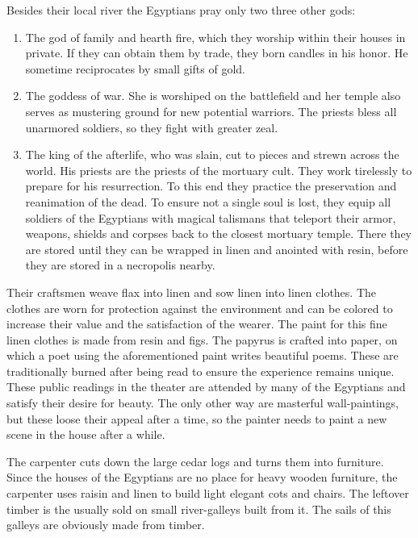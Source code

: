 \documentclass[a4paper]{book}
\begin{document}
Besides their local river the \gls{Egyptians} pray only two three other gods:

\begin{enumerate}
	\item The god of family and hearth fire, which they worship within their houses in
	      private. If they can obtain them by trade, they born candles in his honor. He
	      sometime reciprocates by small gifts of gold.
	\item The goddess of war. She is worshiped on the battlefield and her temple also
	      serves as mustering ground for new potential warriors. The priests bless all
	      unarmored soldiers, so they fight with greater zeal.
	\item The king of the afterlife, who was slain, cut to pieces and strewn across the
	      world. His priests are the priests of the mortuary cult. They work tirelessly
	      to prepare for his resurrection. To this end they practice the preservation and
	      reanimation of the dead. To ensure not a single soul is lost, they equip all
	      soldiers of the \gls{Egyptians} with magical talismans that teleport their
	      armor, weapons, shields and corpses back to the closest mortuary temple. There
	      they are stored until they can be wrapped in linen and anointed with resin,
	      before they are stored in a necropolis nearby.
\end{enumerate}

Their craftsmen weave flax into linen and sow linen into linen clothes. The
clothes are worn for protection against the environment and can be colored to
increase their value and the satisfaction of the wearer. The paint for this
fine linen clothes is made from resin and figs. The papyrus is crafted into
paper, on which a poet using the aforementioned paint writes beautiful poems.
These are traditionally burned after being read to ensure the experience
remains unique. These public readings in the theater are attended by many of
the \gls{Egyptians} and satisfy their desire for beauty. The only other way are
masterful wall-paintings, but these loose their appeal after a time, so the
painter needs to paint a new scene in the house after a while.

The carpenter cuts down the large cedar logs and turns them into furniture.
Since the houses of the \gls{Egyptians} are no place for heavy wooden
furniture, the carpenter uses raisin and linen to build light elegant cots and
chairs. The leftover timber is the usually sold on small river-galleys built
from it. The sails of this galleys are obviously made from timber.
\end{document}
